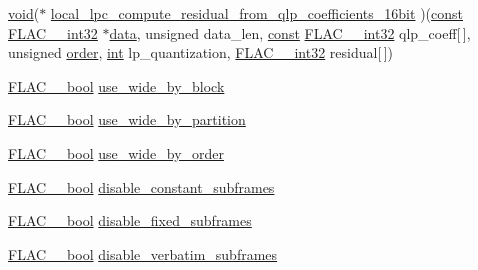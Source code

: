 \begin{DoxyCompactItemize}
\item 
\hyperlink{sound_8c_ae35f5844602719cf66324f4de2a658b3}{void}($\ast$ \hyperlink{struct_f_l_a_c_____stream_encoder_private_a42b995d66c59f45a68d40704d2aad999}{local\+\_\+lpc\+\_\+compute\+\_\+residual\+\_\+from\+\_\+qlp\+\_\+coefficients\+\_\+16bit} )(\hyperlink{getopt1_8c_a2c212835823e3c54a8ab6d95c652660e}{const} \hyperlink{ordinals_8h_a33fd77bfe6d685541a0c034a75deccdc}{F\+L\+A\+C\+\_\+\+\_\+int32} $\ast$\hyperlink{lib_2expat_8h_ac39e72a1de1cb50dbdc54b08d0432a24}{data}, unsigned data\+\_\+len, \hyperlink{getopt1_8c_a2c212835823e3c54a8ab6d95c652660e}{const} \hyperlink{ordinals_8h_a33fd77bfe6d685541a0c034a75deccdc}{F\+L\+A\+C\+\_\+\+\_\+int32} qlp\+\_\+coeff\mbox{[}$\,$\mbox{]}, unsigned \hyperlink{rfft2d_test_m_l_8m_abc2d8236fc76d7a9d742d7eae7e459cd}{order}, \hyperlink{xmltok_8h_a5a0d4a5641ce434f1d23533f2b2e6653}{int} lp\+\_\+quantization, \hyperlink{ordinals_8h_a33fd77bfe6d685541a0c034a75deccdc}{F\+L\+A\+C\+\_\+\+\_\+int32} residual\mbox{[}$\,$\mbox{]})
\item 
\hyperlink{ordinals_8h_a95103469f1cbd78b8cf250194985b34e}{F\+L\+A\+C\+\_\+\+\_\+bool} \hyperlink{struct_f_l_a_c_____stream_encoder_private_abc6c5a80c2c9a9210f80d639061856d2}{use\+\_\+wide\+\_\+by\+\_\+block}
\item 
\hyperlink{ordinals_8h_a95103469f1cbd78b8cf250194985b34e}{F\+L\+A\+C\+\_\+\+\_\+bool} \hyperlink{struct_f_l_a_c_____stream_encoder_private_a5e9a2417db075678eb7d9acb87d1591e}{use\+\_\+wide\+\_\+by\+\_\+partition}
\item 
\hyperlink{ordinals_8h_a95103469f1cbd78b8cf250194985b34e}{F\+L\+A\+C\+\_\+\+\_\+bool} \hyperlink{struct_f_l_a_c_____stream_encoder_private_aee453774c71d9b65ba0169e46a00e8e8}{use\+\_\+wide\+\_\+by\+\_\+order}
\item 
\hyperlink{ordinals_8h_a95103469f1cbd78b8cf250194985b34e}{F\+L\+A\+C\+\_\+\+\_\+bool} \hyperlink{struct_f_l_a_c_____stream_encoder_private_a69b989da47b84b8b04c512a53694abac}{disable\+\_\+constant\+\_\+subframes}
\item 
\hyperlink{ordinals_8h_a95103469f1cbd78b8cf250194985b34e}{F\+L\+A\+C\+\_\+\+\_\+bool} \hyperlink{struct_f_l_a_c_____stream_encoder_private_a051b707638dd22e8f99394708b81db21}{disable\+\_\+fixed\+\_\+subframes}
\item 
\hyperlink{ordinals_8h_a95103469f1cbd78b8cf250194985b34e}{F\+L\+A\+C\+\_\+\+\_\+bool} \hyperlink{struct_f_l_a_c_____stream_encoder_private_a36e438b7b34b703b92ff511c2a70f6ce}{disable\+\_\+verbatim\+\_\+subframes}
\item 

\end{DoxyCompactItemize}
